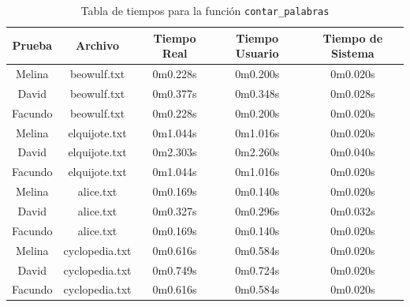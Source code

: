 \documentclass[a4paper, 10pt, twoside, notitlepage]{article}
\begin{document}
\begin{table}[H]
    \centering
    \begin{tabular}{|c|c|c|c|c|}
        \hline
         Prueba & Archivo & Tiempo Real & Tiempo Usuario & Tiempo de Sistema   \\ \hline
         Melina & beowulf.txt & 0m0.228s & 0m0.200s & 0m0.020s \\ \hline
         David & beowulf.txt & 0m0.377s & 0m0.348s & 0m0.028s \\ \hline
         Facundo & beowulf.txt & 0m0.228s & 0m0.200s & 0m0.020s \\ \hline
         Melina & elquijote.txt & 0m1.044s & 0m1.016s & 0m0.020s \\ \hline
         David & elquijote.txt & 0m2.303s & 0m2.260s & 0m0.040s \\ \hline
         Facundo & elquijote.txt & 0m1.044s & 0m1.016s & 0m0.020s \\ \hline
         Melina & alice.txt & 0m0.169s & 0m0.140s & 0m0.020s \\ \hline
         David & alice.txt & 0m0.327s & 0m0.296s & 0m0.032s \\ \hline
         Facundo & alice.txt & 0m0.169s & 0m0.140s & 0m0.020s \\ \hline
         Melina & cyclopedia.txt & 0m0.616s & 0m0.584s & 0m0.020s \\ \hline
         David & cyclopedia.txt & 0m0.749s & 0m0.724s & 0m0.020s \\ \hline
         Facundo & cyclopedia.txt & 0m0.616s & 0m0.584s & 0m0.020s \\ \hline
         
    \end{tabular}
    \caption{Tabla de tiempos para la función \texttt{contar\_palabras}}
    \label{tab:contar_palabras}
\end{table}
\end{document}
